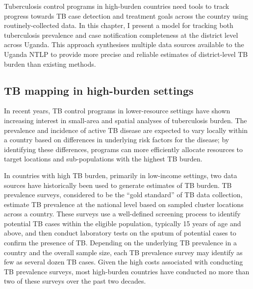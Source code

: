 \documentclass[
]{report}
\begin{document}
Tuberculosis control programs in high-burden countries need tools to track progress towards TB case detection and treatment goals across the country using routinely-collected data. In this chapter, I present a model for tracking both tuberculosis prevalence and case notification completeness at the district level across Uganda. This approach synthesises multiple data sources available to the Uganda NTLP to provide more precise and reliable estimates of district-level TB burden than existing methods.

\hypertarget{tb-mapping-in-high-burden-settings}{%
\subsection{TB mapping in high-burden settings}\label{tb-mapping-in-high-burden-settings}}

In recent years, TB control programs in lower-resource settings have shown increasing interest in small-area and spatial analyses of tuberculosis burden.\autocite{Glaziou2018a} The prevalence and incidence of active TB disease are expected to vary locally within a country based on differences in underlying risk factors for the disease; by identifying these differences, programs can more efficiently allocate resources to target locations and sub-populations with the highest TB burden.\autocite{Rood2019}

In countries with high TB burden, primarily in low-income settings, two data sources have historically been used to generate estimates of TB burden. TB prevalence surveys, considered to be the ``gold standard'' of TB data collection, estimate TB prevalence at the national level based on sampled cluster locations across a country. These surveys use a well-defined screening process to identify potential TB cases within the eligible population, typically 15 years of age and above, and then conduct laboratory tests on the sputum of potential cases to confirm the presence of TB.\autocite{Glaziou2008} Depending on the underlying TB prevalence in a country and the overall sample size, each TB prevalence survey may identify as few as several dozen TB cases. Given the high costs associated with conducting TB prevalence surveys, most high-burden countries have conducted no more than two of these surveys over the past two decades.\autocite{Glaziou2008,WorldHealthOrganization2020a}
\end{document}
